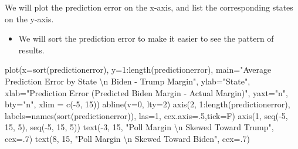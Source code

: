 \documentclass[
  letterpaper,
  DIV=11,
  numbers=noendperiod]{scrreprt}
\newenvironment{Shaded}{\begin{snugshade}}{\end{snugshade}}
\newcommand{\AttributeTok}[1]{\textcolor[rgb]{0.40,0.45,0.13}{#1}}
\newcommand{\DecValTok}[1]{\textcolor[rgb]{0.68,0.00,0.00}{#1}}
\newcommand{\FunctionTok}[1]{\textcolor[rgb]{0.28,0.35,0.67}{#1}}
\newcommand{\NormalTok}[1]{\textcolor[rgb]{0.00,0.23,0.31}{#1}}
\newcommand{\SpecialCharTok}[1]{\textcolor[rgb]{0.37,0.37,0.37}{#1}}
\newcommand{\StringTok}[1]{\textcolor[rgb]{0.13,0.47,0.30}{#1}}
\providecommand{\tightlist}{%
  \setlength{\itemsep}{0pt}\setlength{\parskip}{0pt}}\usepackage{longtable,booktabs,array}
\begin{document}
We will plot the prediction error on the x-axis, and list the
corresponding states on the y-axis.

\begin{itemize}
\tightlist
\item
  We will sort the prediction error to make it easier to see the pattern
  of results.
\end{itemize}

\begin{Shaded}
\begin{Highlighting}[]
\FunctionTok{plot}\NormalTok{(}\AttributeTok{x=}\FunctionTok{sort}\NormalTok{(predictionerror), }\AttributeTok{y=}\DecValTok{1}\SpecialCharTok{:}\FunctionTok{length}\NormalTok{(predictionerror),}
     \AttributeTok{main=}\StringTok{"Average Prediction Error by State }\SpecialCharTok{\textbackslash{}n}\StringTok{ Biden {-} Trump Margin"}\NormalTok{,}
     \AttributeTok{ylab=}\StringTok{"State"}\NormalTok{,}
     \AttributeTok{xlab=}\StringTok{"Prediction Error (Predicted Biden Margin {-} Actual Margin)"}\NormalTok{,}
     \AttributeTok{yaxt=}\StringTok{"n"}\NormalTok{,}
     \AttributeTok{bty=}\StringTok{"n"}\NormalTok{,}
     \AttributeTok{xlim =} \FunctionTok{c}\NormalTok{(}\SpecialCharTok{{-}}\DecValTok{5}\NormalTok{, }\DecValTok{15}\NormalTok{)) }
\FunctionTok{abline}\NormalTok{(}\AttributeTok{v=}\DecValTok{0}\NormalTok{, }\AttributeTok{lty=}\DecValTok{2}\NormalTok{)}
\FunctionTok{axis}\NormalTok{(}\DecValTok{2}\NormalTok{, }\DecValTok{1}\SpecialCharTok{:}\FunctionTok{length}\NormalTok{(predictionerror), }\AttributeTok{labels=}\FunctionTok{names}\NormalTok{(}\FunctionTok{sort}\NormalTok{(predictionerror)), }\AttributeTok{las=}\DecValTok{1}\NormalTok{, }
     \AttributeTok{cex.axis=}\NormalTok{.}\DecValTok{5}\NormalTok{,}\AttributeTok{tick=}\NormalTok{F)}
\FunctionTok{axis}\NormalTok{(}\DecValTok{1}\NormalTok{, }\FunctionTok{seq}\NormalTok{(}\SpecialCharTok{{-}}\DecValTok{5}\NormalTok{, }\DecValTok{15}\NormalTok{, }\DecValTok{5}\NormalTok{), }\FunctionTok{seq}\NormalTok{(}\SpecialCharTok{{-}}\DecValTok{5}\NormalTok{, }\DecValTok{15}\NormalTok{, }\DecValTok{5}\NormalTok{))}
\FunctionTok{text}\NormalTok{(}\SpecialCharTok{{-}}\DecValTok{3}\NormalTok{, }\DecValTok{15}\NormalTok{, }\StringTok{"Poll Margin }\SpecialCharTok{\textbackslash{}n}\StringTok{ Skewed Toward Trump"}\NormalTok{, }\AttributeTok{cex=}\NormalTok{.}\DecValTok{7}\NormalTok{)}
\FunctionTok{text}\NormalTok{(}\DecValTok{8}\NormalTok{, }\DecValTok{15}\NormalTok{, }\StringTok{"Poll Margin }\SpecialCharTok{\textbackslash{}n}\StringTok{ Skewed Toward Biden"}\NormalTok{, }\AttributeTok{cex=}\NormalTok{.}\DecValTok{7}\NormalTok{)}
\end{Highlighting}
\end{Shaded}
\end{document}

